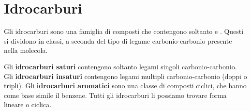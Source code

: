 \chapter*{Idrocarburi}

Gli idrocarburi sono una famiglia di composti che contengono soltanto  e . Questi si dividono in classi, a seconda del tipo di legame carbonio-carbonio presente nella molecola.

Gli \textbf{idrocarburi saturi} contengono soltanto legami singoli carbonio-carbonio. Gli \textbf{idrocarburi insaturi} contengono legami multipli carbonio-carbonio (doppi o tripli). Gli \textbf{idrocarburi aromatici} sono una classe di composti ciclici, che hanno come base simile il benzene.
Tutti gli idrocarburi li possiamo trovare forma lineare o ciclica.

